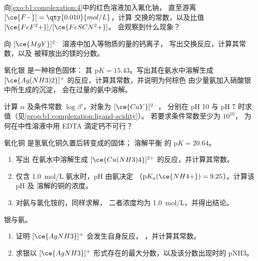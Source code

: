 \begin{exercise}[$\star\star$]\label{exo:b1:complexation:6}
向\cref{exo:b1:complexation:4}中的红色溶液加入氟化钠，
直至游离 $[\ce{F-}] = \qty{0.010}{mol/L}$，计算
交换的常数，以及比值 $[\ce{FeF^2+}]/[\ce{FeSCN^2+}]$。
会观察到什么现象？
\end{exercise}

\begin{exercise}[$\star\star$]\label{exo:b1:complexation:7}
向 $[\ce{MgY}]^{2-}$ 溶液中加入等物质的量的钙离子，
写出交换反应，计算其常数，以及
被释放出的镁的分数。
\end{exercise}

\begin{exercise}[$\star\star$]\label{exo:b1:complexation:8}
氧化银  是一种棕色固体：
其 $\mathrm{p}K = 15.43$。写出其在氨水中溶解生成
$[\ce{Ag(NH3)2}]^{+}$ 的反应，计算其常数，并说明为何棕色
由少量氨加入硝酸银中所生成的沉淀，
会在过量的氨中溶解。
\end{exercise}

\begin{exercise}[$\star\star$]\label{exo:b1:complexation:9}
计算 $\alpha$ 及条件常数 $\log\beta'$，对象为 $[\ce{CaY}]^{2-}$，
分别在 pH 10 与 pH 7 时求值（见\cref{prop:b1:complexation:ligand-acidity}）。
若要求条件常数至少为 $10^{10}$，
为何在中性溶液中用 EDTA 滴定钙不可行？
\end{exercise}

\begin{exercise}[$\star\star\star$]\label{exo:b1:complexation:10}
氧化铜  是氢氧化铜久置后转变成的固体；
溶解平衡  的 $\mathrm{p}K = 20.64$。
\begin{enumerate}
  \item 写出  在氨水中溶解生成
        $[\ce{Cu(NH3)4}]^{2+}$ 的反应，并计算其常数。
  \item 仅含 \qty{1.0}{mol/L} 氨水时，pH 由氨决定
        （$\mathrm{p}K_a(\ce{NH4+}) = 9.25$）。计算该 pH 及
        溶解的铜的浓度。
  \item 对氨与氯化铵的，同样求解，
        二者浓度均为 \qty{1.0}{mol/L}，并得出结论。
\end{enumerate}
\end{exercise}

\begin{exercise}[$\star\star\star$]\label{exo:b1:complexation:11}
银与氨。
\begin{enumerate}
  \item 证明 $[\ce{AgNH3}]^{+}$ 会发生自身反应，
        ，并计算其常数。
  \item 求银以
        $[\ce{AgNH3}]^{+}$ 形式存在的最大分数，以及该分数出现时的 pNH3。
\end{enumerate}
\end{exercise}

